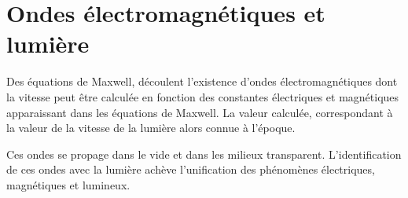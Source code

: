 
\section{Ondes électromagnétiques et lumière}

Des équations de Maxwell, découlent l'existence d'ondes électromagnétiques dont la vitesse peut être calculée en fonction des constantes électriques et magnétiques apparaissant dans les équations de Maxwell. La valeur calculée, correspondant à la valeur de la vitesse de la lumière alors connue à l'époque.

Ces ondes se propage dans le vide et dans les milieux transparent. L'identification de ces ondes avec la lumière achève l'unification des phénomènes électriques, magnétiques et lumineux.


